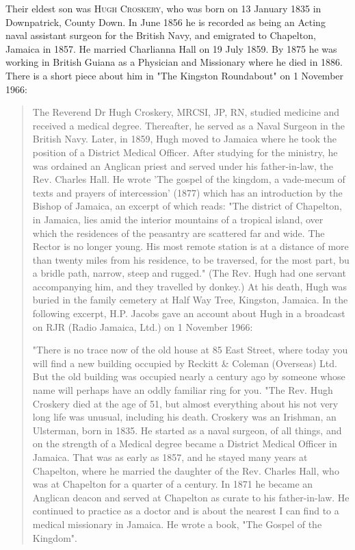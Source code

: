 Their eldest son was \textsc{Hugh Croskery},  who was born on 13 January 1835 in Downpatrick, County Down. In June 1856 he is recorded as being an Acting naval assistant surgeon for the British Navy, and emigrated to Chapelton, Jamaica in 1857.  He married Charlianna Hall on	19 July 1859. By 1875 he was working in	British Guiana as a Physician and Missionary where he died in 1886. There is a short piece about him in "The Kingston Roundabout" on 1 November 1966:
\begin{quotation}
The Reverend Dr Hugh Croskery, MRCSI, JP, RN, studied medicine and received a medical degree. Thereafter, he served as a Naval Surgeon in the British Navy. Later, in 1859, Hugh moved to Jamaica where he took the position of a District Medical Officer. After studying for the ministry, he was ordained an Anglican priest and served under his father-in-law, the Rev. Charles Hall. He wrote 'The gospel of the kingdom, a vade-mecum of texts and prayers of intercession' (1877) which has an introduction by the Bishop of Jamaica, an excerpt of which reads: "The district of Chapelton, in Jamaica, lies amid the interior mountains of a tropical island, over which the residences of the peasantry are scattered far and wide. The Rector is no longer young. His most remote station is at a distance of more than twenty miles from his residence, to be traversed, for the most part, bu a bridle path, narrow, steep and rugged." (The Rev. Hugh had one servant accompanying him, and they travelled by donkey.) At his death, Hugh was buried in the family cemetery at Half Way Tree, Kingston, Jamaica. In the following excerpt, H.P. Jacobs gave an account about Hugh in a broadcast on RJR 
(Radio Jamaica, Ltd.) on 1 November 1966:

    "There is no trace now of the old house at 85 East Street, where today you will  
    find a new building occupied by Reckitt \& Coleman (Overseas) Ltd.  But the old building 
    was occupied nearly a century ago by someone whose name will perhaps  
    have an oddly familiar ring for you. 
         "The Rev. Hugh Croskery died at the age of 51, but almost everything about his  
    not very long life was unusual, including his death. Croskery was an Irishman, an  
    Ulsterman, born in 1835.  He started as a naval surgeon, of all things, and on the  
    strength of a Medical degree became a District Medical Officer in Jamaica. That was  
    as early as 1857, and he stayed many years at Chapelton, where he married the  
    daughter of the Rev. Charles Hall, who was at Chapelton for a quarter of a century.   
    In 1871 he became an Anglican deacon and served at Chapelton as curate to his  
    father-in-law.  He continued to practice as a doctor and is about the nearest I can  
    find to a medical missionary in Jamaica. He wrote a book, "The Gospel of the Kingdom".
    \end{quotation}
    
